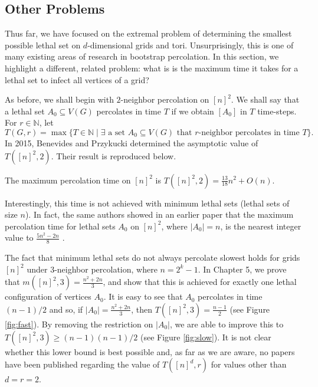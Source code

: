 \subsection{Other Problems}

Thus far, we have focused on the extremal problem of determining the smallest possible lethal set on $d$-dimensional grids and tori. Unsurprisingly, this is one of many existing areas of research in bootstrap percolation. In this section, we highlight a different, related problem: what is is the maximum time it takes for a lethal set to infect all vertices of a grid?

As before, we shall begin with $2$-neighbor percolation on $[n]^2$. We shall say that a lethal set $A_0 \subseteq V(G)$ percolates in time $T$ if we obtain $[A_0]$ in $T$ time-steps. For $r \in \mathbb{N}$, let
$$T(G,r) = \max\{T \in \mathbb{N} \mid \exists \text{ a set }A_0 \subseteq V(G)\text{ that }r\text{-neighbor percolates in time }T\}.$$
In 2015, Benevides and Przykucki \cite{benevides2015maximum} determined the asymptotic value of $T([n]^2,2)$. Their result is reproduced below.

\begin{thm}
The maximum percolation time on $[n]^2$ is $T([n]^2,2) = \frac{13}{18}n^2 + O(n)$. 
\end{thm}

Interestingly, this time is not achieved with minimum lethal sets (lethal sets of size $n$). In fact, the same authors showed in an earlier paper that the maximum percolation time for lethal sets $A_0$ on $[n]^2$, where $|A_0| = n$, is the nearest integer value to $\frac{5n^2-2n}{8}$ \cite{benevides2013slowly}. 

The fact that minimum lethal sets do not always percolate slowest holds for grids $[n]^2$ under 3-neighbor percolation, where $n=2^k-1$. In Chapter 5, we prove that $m([n]^2,3) = \frac{n^2+2n}{3}$, and show that this is achieved for exactly one lethal configuration of vertices $A_0$. It is easy to see that $A_0$ percolates in time $(n-1)/2$ and so, if $|A_0| = \frac{n^2+2n}{3}$, then $T([n]^2,3) = \frac{n-1}{2}$ (see Figure \ref{fig:fast}). By removing the restriction on $|A_0|$, we are able to improve this to $T([n]^2,3) \geq (n-1)(n-1)/2$ (see Figure \ref{fig:slow}). It is not clear whether this lower bound is best possible and, as far as we are aware, no papers have been published regarding the value of $T([n]^d,r)$ for values other than $d=r=2$. 

